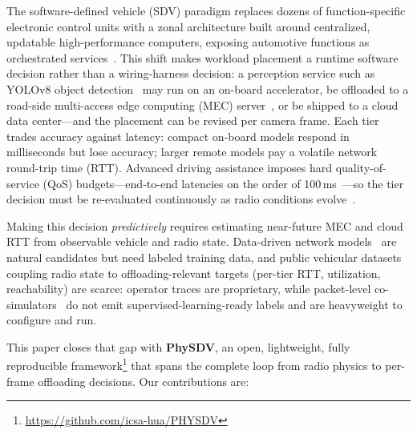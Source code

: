 \documentclass[10pt,conference]{IEEEtran}
\begin{document}
The software-defined vehicle (SDV) paradigm replaces dozens of
function-specific electronic control units with a zonal architecture built
around centralized, updatable high-performance computers, exposing
automotive functions as orchestrated services~\cite{liu2022sdv}.  This
shift makes workload placement a runtime software decision rather than a
wiring-harness decision: a perception service such as YOLOv8 object
detection~\cite{yolov8} may run on an on-board accelerator, be offloaded
to a road-side multi-access edge computing (MEC) server~\cite{etsi_mec},
or be shipped to a cloud data center---and the placement can be revised
per camera frame.  Each tier trades accuracy against latency: compact
on-board models respond in milliseconds but lose accuracy; larger
remote models pay a volatile network round-trip time (RTT).  Advanced driving assistance imposes hard
quality-of-service (QoS) budgets---end-to-end latencies on the order of
100\,ms~\cite{3gpp22186}---so the tier decision must be re-evaluated
continuously as radio conditions evolve~\cite{liu2019autodriving}.

Making this decision \emph{predictively} requires estimating near-future
MEC and cloud RTT from observable vehicle and radio state.  Data-driven
network models~\cite{rusek2020routenet,almasan2022dtn} are natural
candidates but need labeled training data, and public vehicular datasets
coupling radio state to offloading-relevant targets (per-tier RTT,
utilization, reachability) are scarce: operator traces are proprietary,
while packet-level co-simulators~\cite{sommer2011veins,lopez2018sumo} do
not emit supervised-learning-ready labels and are heavyweight to configure
and run.

This paper closes that gap with \textbf{PhySDV}, an open, lightweight,
fully reproducible framework\footnote{\url{https://github.com/icsa-hua/PHYSDV}}
that spans the complete loop from radio physics to
per-frame offloading decisions.  Our contributions are:
\end{document}
